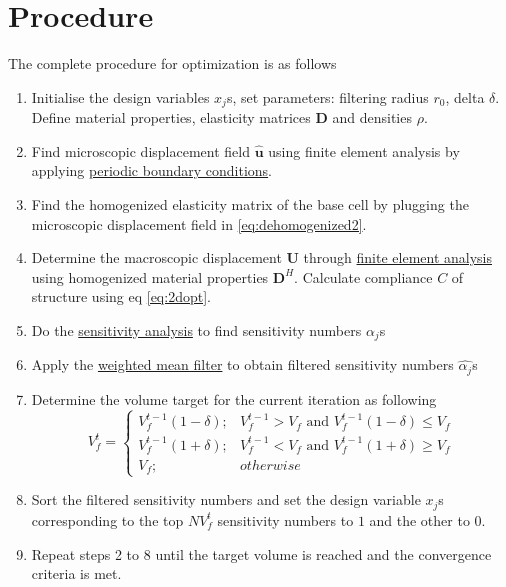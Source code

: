 \documentclass[openright,twoside]{iitkthesis}
\newcommand{\e}[1]{\textbf{#1}}
\begin{document}
\section{Procedure}
The complete procedure for optimization is as follows
\begin{enumerate}[start=1,label={Step \arabic*:}]
\item Initialise the design variables $x_j$s, set parameters: filtering radius $r_0$, delta $\delta$. Define material properties, elasticity matrices $\e D$ and densities $\rho$.
\item Find microscopic displacement field $\hat{\e u}$ using finite element analysis by applying \hyperref[sec:pbc]{periodic boundary conditions}.
\item Find the homogenized elasticity matrix of the base cell by plugging the microscopic displacement field in \eqref{eq:dehomogenized2}.
\item Determine the macroscopic displacement $\e U$ through \hyperref[eq:KM]{finite element analysis} using homogenized material properties $\e D^H$. Calculate compliance $C$ of structure using eq \eqref{eq:2dopt}.
\item Do the \hyperref[eq:senanal]{sensitivity analysis} to find sensitivity numbers $\alpha_j$s
\item Apply the \hyperref[eq:wmfilter]{weighted mean filter} to obtain filtered sensitivity numbers $\hat{\alpha_j}$s
\item Determine the volume target for the current iteration as following
\begin{equation}
V^t_f = 
\begin{cases}
V^{t-1}_f(1-\delta);& V^{t-1}_f>V_f \text{ and } V^{t-1}_f(1-\delta) \leq V_f\\
V^{t-1}_f(1+\delta);& V^{t-1}_f<V_f \text{ and } V^{t-1}_f(1+\delta) \geq V_f\\
V_f;& otherwise
\end{cases}
\end{equation}
\item Sort the filtered sensitivity numbers and set the design variable $x_j$s corresponding to the top $NV^t_f$ sensitivity numbers to $1$ and the other to $0$.
\item Repeat steps 2 to 8 until the target volume is reached and the convergence criteria is met. \end{enumerate}
\end{document}
